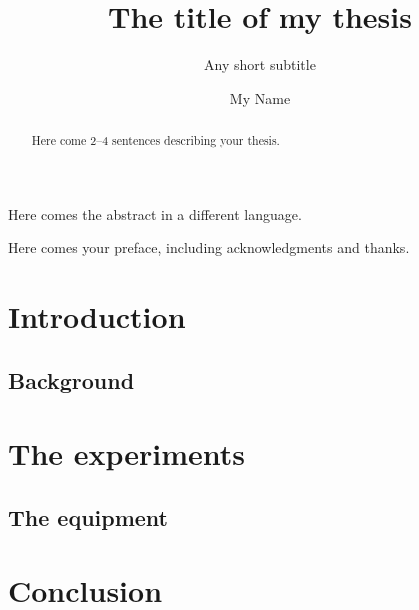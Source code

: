 \documentclass[UKenglish]{uiobachelorthesis}  %
\title{The title of my thesis}        %
\subtitle{Any short subtitle}         %
\author{My Name}                      %
\begin{document}
\uiomasterfp[dept={Department of Physics},  %
  program={Physics},                        %
  supervisor={The Name},                    %
  bachelor, compact]                        %

\maketitle

\begin{abstract}
  Here come 2--4 sentences describing your thesis.
\end{abstract}
\begin{xabstract}[Sammendrag]               %
  Here comes the abstract in a different language.
\end{xabstract}

\tableofcontents{}                          %

\begin{preface}
  Here comes your preface, including acknowledgments and thanks.
\end{preface}

\section{Introduction}                  %
\subsection{Background}                 %

\section{The experiments}               %
\subsection{The equipment}              %

\section{Conclusion}                    %

\printbibliography{}
\end{document}
